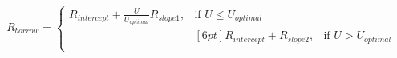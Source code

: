 \documentclass[preview]{standalone}
\begin{document}
\begin{align*}
R_{borrow} = 
                            \begin{cases}
                                R_{intercept} + \frac{ U }{ U _{optimal}}R_{slope1}, & \text{if }  U  \leq  U _{optimal}\\
                                    &[6pt] R_{intercept} + R_{slope2}, & \text{if }  U  >  U _{optimal}\\
                            \end{cases}
\end{align*}
\end{document}
